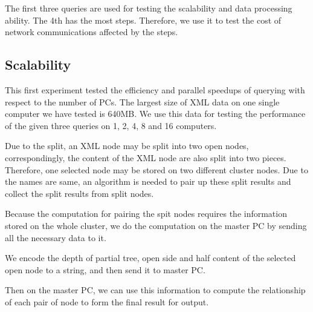 The first three queries are used for testing the scalability and data processing ability.
The 4th has the most steps. Therefore, we use it to test the cost of
network communications affected by the steps.

\subsection{Scalability}

This first experiment tested the efficiency and parallel speedups of
querying with respect to the number of PCs. The largest size of XML data
on one single computer we have tested is 640MB. We use this data
for testing the performance of the given three queries on 1, 2, 4, 8 and 16 computers.

Due to the split, an XML node may be split into two
open nodes, correspondingly, the content of the XML
node are also split into two pieces. Therefore, one selected
node may be stored on two different cluster nodes. Due to
the names are same, an algorithm is needed to pair up these
split results and collect the split results from split nodes.

Because the computation for pairing the spit nodes
requires the information stored on the whole cluster, we do
the computation on the master PC by sending all the
necessary data to it.

We encode the depth of partial tree, open side and half
content of the selected open node to a string, and then send
it to master PC.

Then on the master PC, we can use this information to
compute the relationship of each pair of node to form the
final result for output.
